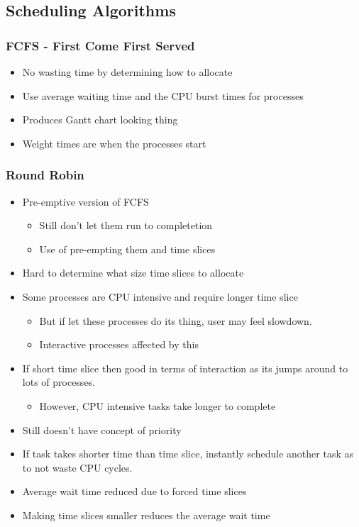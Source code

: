 \documentclass{article}
\begin{document}
	\subsection{Scheduling Algorithms}
		\subsubsection{FCFS - First Come First Served}
		\begin{itemize}
			\item No wasting time by determining how to allocate
			\item Use average waiting time and the CPU burst times for processes
			\item Produces Gantt chart looking thing
			\item Weight times are when the processes start
		\end{itemize}

		\subsubsection{Round Robin}
		\begin{itemize}
			\item Pre-emptive version of FCFS
			\begin{itemize}
				\item Still don't let them run to completetion
				\item Use of pre-empting them and time slices
			\end{itemize}
			\item Hard to determine what size time slices to allocate
			\item Some processes are CPU intensive and require longer time slice
			\begin{itemize}
				\item But if let these processes do its thing, user may feel slowdown. 
				\item Interactive processes affected by this
			\end{itemize}
			\item If short time slice then good in terms of interaction as its jumps around to lots of processes.
			\begin{itemize}
				\item However, CPU intensive tasks take longer to complete
			\end{itemize}
			\item Still doesn't have concept of priority

			\item If task takes shorter time than time slice, instantly schedule another task as to not waste CPU cycles.
			\item Average wait time reduced due to forced time slices
			\item Making time slices smaller reduces the average wait time
		\end{itemize}
\end{document}
